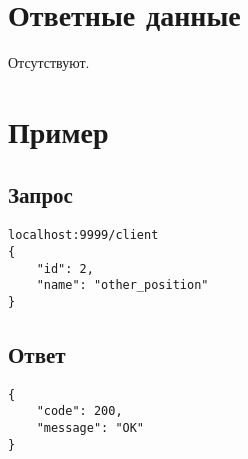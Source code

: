 \section*{Ответные данные}
Отсутствуют.

\section*{Пример}

\subsection*{Запрос}

\begin{lstlisting}
localhost:9999/client
{
	"id": 2,
	"name": "other_position"
}
\end{lstlisting}
\hfill

\subsection*{Ответ}

\begin{lstlisting}
{
	"code": 200,
	"message": "OK"
}
\end{lstlisting}
\hfill